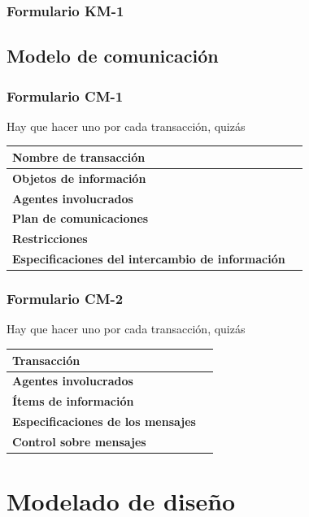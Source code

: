 \documentclass[a4paper,11pt]{article}
\begin{document}
			\subsubsection{Formulario KM-1}
			
		\newpage
		\subsection{Modelo de comunicación}
			\subsubsection{Formulario CM-1}
			Hay que hacer uno por cada transacción, quizás
			\begin{center}
				\begin{tabular}{| l | l |}
					\hline
					\textbf{Nombre de transacción} & \\
					\hline
					\textbf{Objetos de información} & \\
					\hline
					\textbf{Agentes involucrados} & \\
					\hline
					\textbf{Plan de comunicaciones} & \\
					\hline
					\textbf{Restricciones} & \\
					\hline
					\textbf{Especificaciones del intercambio de información} & \\
					\hline
				\end{tabular}
			\end{center}
			\subsubsection{Formulario CM-2}
			Hay que hacer uno por cada transacción, quizás
			\begin{center}
				\begin{tabular}{| l | l |}
					\hline
					\textbf{Transacción} & \\
					\hline
					\textbf{Agentes involucrados} & \\
					\hline
					\textbf{Ítems de información} & \\
					\hline
					\textbf{Especificaciones de los mensajes} & \\
					\hline
					\textbf{Control sobre mensajes} & \\
					\hline
				\end{tabular}
			\end{center}
	\newpage
	\section{Modelado de diseño}
\end{document}
